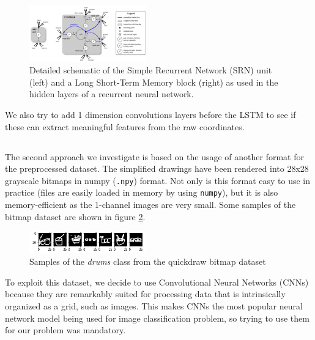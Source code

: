 \documentclass[10pt,twocolumn,letterpaper]{article}
\begin{document}
\begin{figure}[h] 
\centering
\includegraphics[width=0.45\textwidth]{images/lstm.png}
\caption{Detailed schematic of the Simple Recurrent Network (SRN) unit (left) and a Long Short-Term Memory block (right) as used in the hidden layers of
a recurrent neural network. \cite[p.~2]{DBLP:journals/corr/GreffSKSS15}}
\label{fig:lstm}
\end{figure}

We also try to add 1 dimension convolutions layers before the LSTM to see if these can extract meaningful features from the raw coordinates.

\subsection{\cnnTitle{}}

The second approach we investigate is based on the usage of another format for the preprocessed dataset. The simplified drawings have been rendered into 28x28 grayscale bitmaps in numpy (\texttt{.npy}) format. Not only is this format easy to use in practice (files are easily loaded in memory by using \texttt{numpy}), but it is also memory-efficient as the 1-channel images are very small. Some samples of the bitmap dataset are shown in figure \ref{fig:bitmap_drums}.

\begin{figure}[h] 
\centering
\includegraphics[width=0.45\textwidth]{images/bitmaps_drums.png}
\caption{Samples of the \textit{drums} class from the quickdraw bitmap dataset}
\label{fig:bitmap_drums}
\end{figure}

To exploit this dataset, we decide to use Convolutional Neural Networks (CNNs) because they are remarkably suited for processing data that is intrinsically organized as a grid, such as images. This makes CNNs the most popular neural network model being used for image classification problem, so trying to use them for our problem was mandatory.
\end{document}
